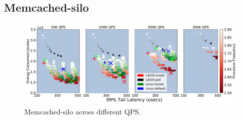 \subsection{Memcached-silo}
\label{sec:mcdsilo}

\begin{figure}
\centering
\includegraphics[width=1\textwidth]{figures/mcdsilo_overview}
\caption[]
{Memcached-silo across different QPS.}
\label{fig:mcdsilo_overview}
\end{figure}